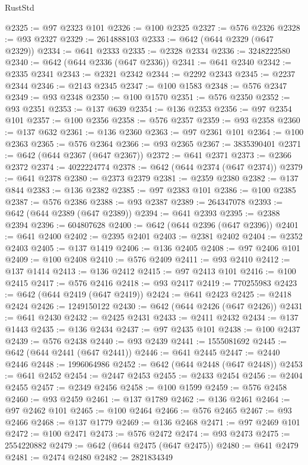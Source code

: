 \begin{lexlean}{RustStd}
\begin{coremodule}
@2325 := @97 @2323 @101
@2326 := @100 @2325
@2327 := @576 @2326
@2328 := @93 @2327
@2329 := 2614888103
@2333 := @642 (@644 @2329 (@647 @2329))
@2334 := @641 @2333
@2335 := @2328 @2334
@2336 := 3248222580
@2340 := @642 (@644 @2336 (@647 @2336))
@2341 := @641 @2340
@2342 := @2335 @2341
@2343 := @2321 @2342
@2344 := @2292 @2343
@2345 := @2237 @2344
@2346 := @2143 @2345
@2347 := @100 @1583
@2348 := @576 @2347
@2349 := @93 @2348
@2350 := @100 @1570
@2351 := @576 @2350
@2352 := @93 @2351
@2353 := @137 @639
@2354 := @136 @2353
@2356 := @97 @2354 @101
@2357 := @100 @2356
@2358 := @576 @2357
@2359 := @93 @2358
@2360 := @137 @632
@2361 := @136 @2360
@2363 := @97 @2361 @101
@2364 := @100 @2363
@2365 := @576 @2364
@2366 := @93 @2365
@2367 := 3835390401
@2371 := @642 (@644 @2367 (@647 @2367))
@2372 := @641 @2371
@2373 := @2366 @2372
@2374 := 4022224774
@2378 := @642 (@644 @2374 (@647 @2374))
@2379 := @641 @2378
@2380 := @2373 @2379
@2381 := @2359 @2380
@2382 := @137 @844
@2383 := @136 @2382
@2385 := @97 @2383 @101
@2386 := @100 @2385
@2387 := @576 @2386
@2388 := @93 @2387
@2389 := 264347078
@2393 := @642 (@644 @2389 (@647 @2389))
@2394 := @641 @2393
@2395 := @2388 @2394
@2396 := 604807628
@2400 := @642 (@644 @2396 (@647 @2396))
@2401 := @641 @2400
@2402 := @2395 @2401
@2403 := @2381 @2402
@2404 := @2352 @2403
@2405 := @137 @1419
@2406 := @136 @2405
@2408 := @97 @2406 @101
@2409 := @100 @2408
@2410 := @576 @2409
@2411 := @93 @2410
@2412 := @137 @1414
@2413 := @136 @2412
@2415 := @97 @2413 @101
@2416 := @100 @2415
@2417 := @576 @2416
@2418 := @93 @2417
@2419 := 770255983
@2423 := @642 (@644 @2419 (@647 @2419))
@2424 := @641 @2423
@2425 := @2418 @2424
@2426 := 1249150122
@2430 := @642 (@644 @2426 (@647 @2426))
@2431 := @641 @2430
@2432 := @2425 @2431
@2433 := @2411 @2432
@2434 := @137 @1443
@2435 := @136 @2434
@2437 := @97 @2435 @101
@2438 := @100 @2437
@2439 := @576 @2438
@2440 := @93 @2439
@2441 := 1555081692
@2445 := @642 (@644 @2441 (@647 @2441))
@2446 := @641 @2445
@2447 := @2440 @2446
@2448 := 1996064986
@2452 := @642 (@644 @2448 (@647 @2448))
@2453 := @641 @2452
@2454 := @2447 @2453
@2455 := @2433 @2454
@2456 := @2404 @2455
@2457 := @2349 @2456
@2458 := @100 @1599
@2459 := @576 @2458
@2460 := @93 @2459
@2461 := @137 @1789
@2462 := @136 @2461
@2464 := @97 @2462 @101
@2465 := @100 @2464
@2466 := @576 @2465
@2467 := @93 @2466
@2468 := @137 @1779
@2469 := @136 @2468
@2471 := @97 @2469 @101
@2472 := @100 @2471
@2473 := @576 @2472
@2474 := @93 @2473
@2475 := 2554220882
@2479 := @642 (@644 @2475 (@647 @2475))
@2480 := @641 @2479
@2481 := @2474 @2480
@2482 := 2821834349

\end{coremodule}
\end{lexlean}
